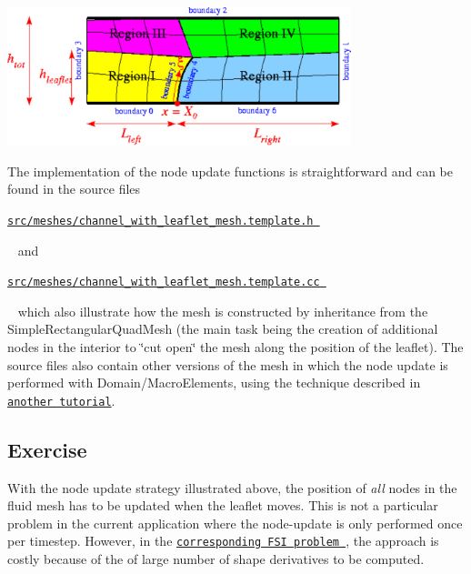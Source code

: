  
\begin{DoxyImage}
\includegraphics[width=0.75\textwidth]{channel_with_leaflet_mesh}
\end{DoxyImage}


The implementation of the node update functions is straightforward and can be found in the source files \begin{center} \href{
../../../../src/meshes/channel_with_leaflet_mesh.template.h}{\tt src/meshes/channel\+\_\+with\+\_\+leaflet\+\_\+mesh.\+template.\+h } \end{center} ~\newline
and \begin{center} \href{
../../../../src/meshes/channel_with_leaflet_mesh.template.cc}{\tt src/meshes/channel\+\_\+with\+\_\+leaflet\+\_\+mesh.\+template.\+cc } \end{center} ~\newline
which also illustrate how the mesh is constructed by inheritance from the {\ttfamily Simple\+Rectangular\+Quad\+Mesh} (the main task being the creation of additional nodes in the interior to \char`\"{}cut open\char`\"{} the mesh along the position of the leaflet). The source files also contain other versions of the mesh in which the node update is performed with Domain/\+Macro\+Elements, using the technique described in \href{../../../poisson/fish_poisson2/html/index.html}{\tt another tutorial}.\hypertarget{index_ex}{}\subsection{Exercise}\label{index_ex}
With the node update strategy illustrated above, the position of {\itshape all} nodes in the fluid mesh has to be updated when the leaflet moves. This is not a particular problem in the current application where the node-\/update is only performed once per timestep. However, in the \href{../../../interaction/fsi_channel_with_leaflet/html/index.html}{\tt corresponding F\+SI problem }, the approach is costly because of the of large number of shape derivatives to be computed.


